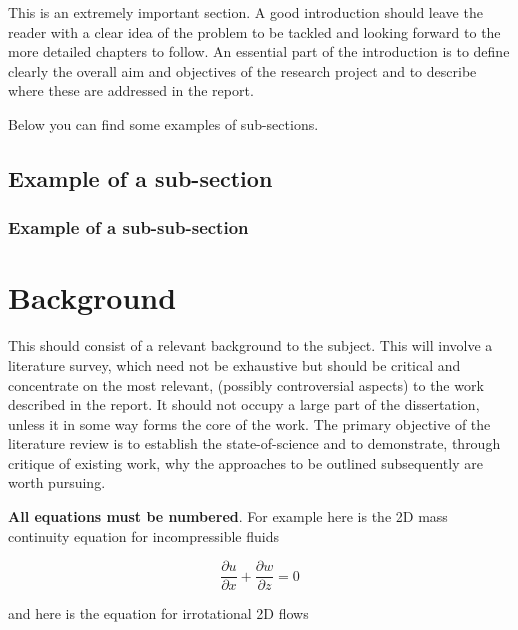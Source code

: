 \documentclass{article}
\begin{document}
This is an extremely important section. A good introduction should leave the reader with a clear idea of the problem to be tackled and looking forward to the more detailed chapters to follow. An essential part of the introduction is to define clearly the overall aim and objectives of the research project and to describe where these are addressed in the report.

Below you can find some examples of sub-sections.

\subsection{Example of a sub-section}
\label{sec:ExampleSubSection}

\subsubsection{Example of a sub-sub-section}
\label{sec:ExampleSubSubSection}





\section{Background}
\label{sec:background}

This should consist of a relevant background to the subject. This will involve a literature survey, which need not be exhaustive but should be critical and concentrate on the most relevant, (possibly controversial aspects) to the work described in the report. It should not occupy a large part of the dissertation, unless it in some way forms the core of the work. The primary objective of the literature review is to establish the  state-of-science  and to demonstrate, through critique of existing work, why the approaches to be outlined subsequently are worth pursuing.

\textbf{All equations must be numbered}. For example here is the 2D mass continuity equation for incompressible fluids


\begin{equation}
  \label{eq:mass-continuity}
  \frac{\partial u}{\partial x} + \frac{\partial w}{\partial z} = 0
\end{equation}

and here is the equation for irrotational 2D flows
\end{document}
